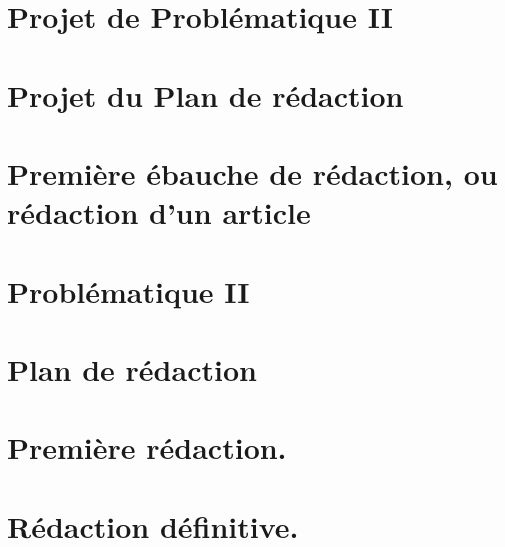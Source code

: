 \documentclass[paper=A4,portrait,twoside=true,twocolumn=false,headinclude=false,footinclude=false,fontsize=11,BCOR=15mm,DIV=calc,pagesize=auto,titlepage=firstiscover,mpinclude=true,headings=normal,headings=twolinechapter,open=right,chapterprefix=false,headsepline=false,parskip=full]{scrbook}
\begin{document}
\chapter{Projet de Problématique II}
\label{sec:orga332b24}
\chapter{Projet du Plan de rédaction}
\label{sec:org41bfc86}
\chapter{Première ébauche de rédaction, ou rédaction d'un article}
\label{sec:orgd293b19}
\chapter{Problématique II}
\label{sec:org0166d38}
\chapter{Plan de rédaction}
\label{sec:org1f297b9}
\chapter{Première rédaction.}
\label{sec:org5ea489b}
\chapter{Rédaction définitive.}
\label{sec:orgd3ba3df}
\end{document}
